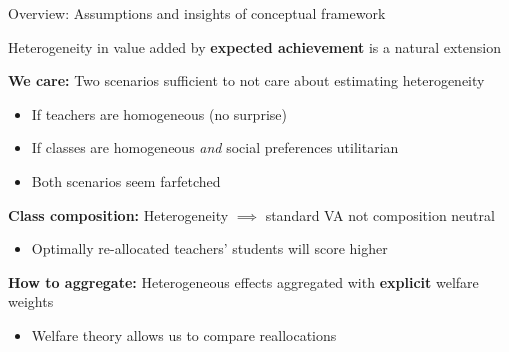 \documentclass[t,aspectratio=169,11pt]{beamer}
\begin{document}
\begin{frame}{Overview: Assumptions and insights of conceptual framework}

\vfill
\begin{wideitemize}
    \item Heterogeneity in value added by {\textbf{expected achievement}} is a natural extension
        
    {\tiny \color{gray} \citep{lockwood2009,condie2014teacher,Delgado2020,bates2022teacher}}

    \item<2-> {\textbf{We care:}} Two scenarios sufficient to not care about estimating heterogeneity
      \begin{itemize}
        \item If teachers are homogeneous (no surprise)
        \item If classes are homogeneous \textit{and} social preferences utilitarian
        \item Both scenarios seem farfetched

        
    \end{itemize}
    \item<3-> {\textbf{Class composition:}} Heterogeneity $\implies$ standard VA not composition neutral
      \begin{itemize}
        \item Optimally re-allocated teachers' students will score higher 
                
    \end{itemize}
    
    \item<4-> {\textbf{How to aggregate:}} Heterogeneous effects aggregated with \textbf{explicit} welfare weights
      \begin{itemize}
        \item  Welfare theory allows us to compare reallocations
        
    \end{itemize} 
\end{wideitemize}
\vfill


\end{frame}
\end{document}
